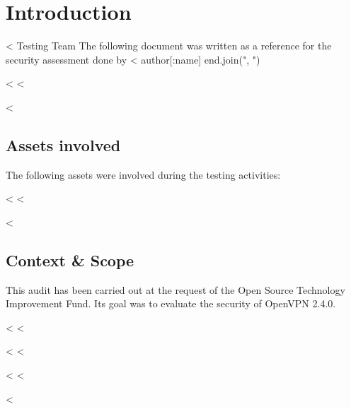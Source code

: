 

\chapter{Introduction}\label{cha:introduction}

  <%
         Testing Team %
  The following document was written as a reference for the security
  assessment done by <%
    author[:name]
  end.join(", ") %

  <%
  <%

  <%
  \section{Assets involved}\label{sec:assets-involved}

    The following assets were involved during the testing activities:

    \begin{itemize}
      <%
        <%
          \item \textbf{<%
        <%
          \item \textbf{<%
        <%
      <%
    \end{itemize}

  <%
  <%

  <%
  \section{Context \& Scope}\label{sec:scope}

    This audit has been carried out at the request of the Open Source Technology
    Improvement Fund. Its goal was to evaluate the security of OpenVPN 2.4.0.

  <%
  <%

  <%
  <%

  <%
  <%


<%
